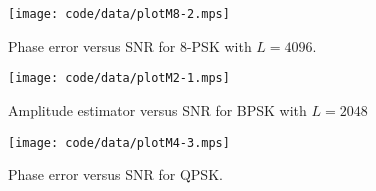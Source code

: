 \documentclass[journal]{IEEEtran}
\begin{document}
\begin{figure}[p]
	\centering
		\texttt{[image: code/data/plotM8-2.mps]}
		\caption{Phase error versus SNR for $8$-PSK with $L=4096$.}
		\label{fig:plotphase8PSK}
\end{figure}



\begin{figure}[tp]
	\centering
		\texttt{[image: code/data/plotM2-1.mps]}
		\caption{Amplitude estimator versus SNR for BPSK with $L=2048$}
		\label{fig:plotampBPSK}
\end{figure}




\begin{figure}[tp]
	\centering
		\texttt{[image: code/data/plotM4-3.mps]}
		\caption{Phase error versus SNR for QPSK.}
		\label{fig:plotphaseQPSKmultL}
\end{figure}


\end{document}

